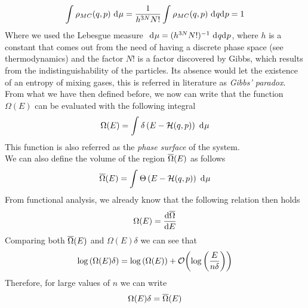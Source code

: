 \documentclass[../qm.tex]{subfiles}
\begin{document}
		\begin{equation}
			\int_{}^{}\rho_{MC}(q,p)\ \mathrm{d}^{}\mu=\frac{1}{h^{3N}N!}\int_{}^{}\rho_{MC}(q,p)\ \mathrm{d}^{}q\mathrm{d}^{}p=1
			\label{eq:rhonormalization}
		\end{equation}
		Where we used the Lebesgue measure $\ \mathrm{d}^{}\mu=(h^{3N}N!)^{-1}\ \mathrm{d}^{}q\mathrm{d}^{}p$, where $h$ is a constant that comes out from the need of having a discrete phase space (see thermodynamics) and the factor $N!$ is a factor discovered by Gibbs, which results from the indistinguishability of the particles. Its absence would let the existence of an entropy of mixing gases, this is referred in literature as \textit{Gibbs' paradox}.\\
		From what we have then defined before, we now can write that the function $\Omega(E)$ can be evaluated with the following integral
		\begin{equation}
			\Omega(E)=\int_{}^{}\delta\left( E-\mathcal{H}(q,p) \right)\ \mathrm{d}^{}\mu
			\label{eq:omegaedirectcalculus}
		\end{equation}
		This function is also referred as the \textit{phase surface} of the system.\\
		We can also define the volume of the region $\overline{\Omega}(E)$ as follows
		\begin{equation}
			\overline{\Omega}(E)=\int_{}^{}\Theta\left( E-\mathcal{H}(q,p) \right)\ \mathrm{d}^{}\mu
			\label{eq:phasevolume}
		\end{equation}
		From functional analysis, we already know that the following relation then holds
		\begin{equation}
			\Omega(E)=\derivative{\cc{\Omega}}{E}
			\label{eq:omegaomegabarrel}
		\end{equation}
		Comparing both $\overline{\Omega}(E)$ and $\Omega(E)\delta$ we can see that
		\begin{equation*}
			\log\left( \Omega(E)\delta \right)=\log\left( \Omega(E) \right)+\order{\log\left( \frac{E}{n\delta} \right)}
		\end{equation*}
		Therefore, for large values of $n$ we can write
		\begin{equation}
			\Omega(E)\delta=\overline{\Omega}(E)
			\label{eq:ccomegaomegauguagliance}
		\end{equation}
\end{document}
